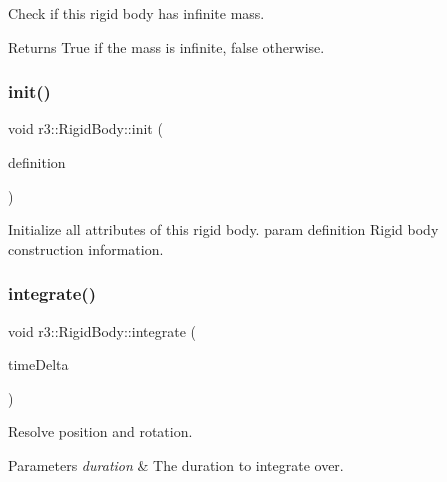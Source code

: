 Check if this rigid body has infinite mass. 

\begin{DoxyReturn}{Returns}
True if the mass is infinite, false otherwise. 
\end{DoxyReturn}
\mbox{\label{classr3_1_1_rigid_body_aa617fb4da3d5aeec43e04983765f7db6}} 
\subsubsection{\texorpdfstring{init()}{init()}}
{\footnotesize\ttfamily void r3\+::\+Rigid\+Body\+::init (\begin{DoxyParamCaption}\item[{const \mbox{\hyperlink{structr3_1_1_rigid_body_def}{Rigid\+Body\+Def}} \&}]{definition }\end{DoxyParamCaption})}



Initialize all attributes of this rigid body. param definition Rigid body construction information. 

\mbox{\label{classr3_1_1_rigid_body_a82945a23582ddfd4bad5c9b51847f9a4}} 
\subsubsection{\texorpdfstring{integrate()}{integrate()}}
{\footnotesize\ttfamily void r3\+::\+Rigid\+Body\+::integrate (\begin{DoxyParamCaption}\item[{\mbox{\hyperlink{namespacer3_ab2016b3e3f743fb735afce242f0dc1eb}{real}}}]{time\+Delta }\end{DoxyParamCaption})\hspace{0.3cm}{\ttfamily [virtual]}}



Resolve position and rotation. 


\begin{DoxyParams}{Parameters}
{\em duration} & The duration to integrate over. \\
\hline
\end{DoxyParams}
\mbox{\label{classr3_1_1_rigid_body_a162bb9f31e5214001dabb1bdd94a9fbf}} 
